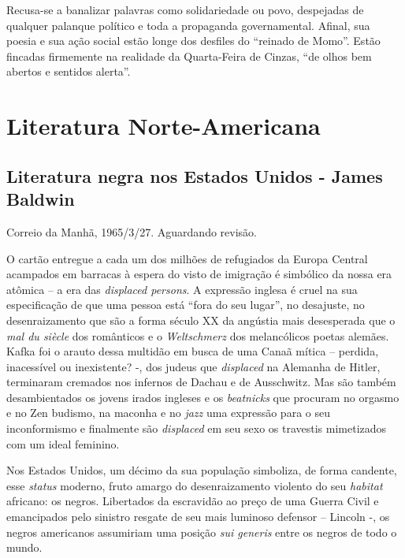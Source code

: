\documentclass[
  letterpaper,
  DIV=11,
  numbers=noendperiod]{scrreprt}
\begin{document}
Recusa-se a banalizar palavras como solidariedade ou povo, despejadas de
qualquer palanque político e toda a propaganda governamental. Afinal,
sua poesia e sua ação social estão longe dos desfiles do ``reinado de
Momo''. Estão fincadas firmemente na realidade da Quarta-Feira de
Cinzas, ``de olhos bem abertos e sentidos alerta''.

\part{Literatura Norte-Americana}

\chapter{Literatura negra nos Estados Unidos - James
Baldwin}\label{literatura-negra-nos-estados-unidos---james-baldwin}

Correio da Manhã, 1965/3/27. Aguardando revisão.

\hfill\break

O cartão entregue a cada um dos milhões de refugiados da Europa Central
acampados em barracas à espera do visto de imigração é simbólico da
nossa era atômica -- a era das \emph{displaced persons}. A expressão
inglesa é cruel na sua especificação de que uma pessoa está ``fora do
seu lugar'', no desajuste, no desenraizamento que são a forma século XX
da angústia mais desesperada que o \emph{mal du siècle} dos românticos e
o \emph{Weltschmerz} dos melancólicos poetas alemães. Kafka foi o arauto
dessa multidão em busca de uma Canaã mítica -- perdida, inacessível ou
inexistente? -, dos judeus que \emph{displaced} na Alemanha de Hitler,
terminaram cremados nos infernos de Dachau e de Ausschwitz. Mas são
também desambientados os jovens irados ingleses e os \emph{beatnicks}
que procuram no orgasmo e no Zen budismo, na maconha e no \emph{jazz}
uma expressão para o seu inconformismo e finalmente são \emph{displaced}
em seu sexo os travestis mimetizados com um ideal feminino.

Nos Estados Unidos, um décimo da sua população simboliza, de forma
candente, esse \emph{status} moderno, fruto amargo do desenraizamento
violento do seu \emph{habitat} africano: os negros. Libertados da
escravidão ao preço de uma Guerra Civil e emancipados pelo sinistro
resgate de seu mais luminoso defensor -- Lincoln -, os negros americanos
assumiriam uma posição \emph{sui generis} entre os negros de todo o
mundo.
\end{document}
